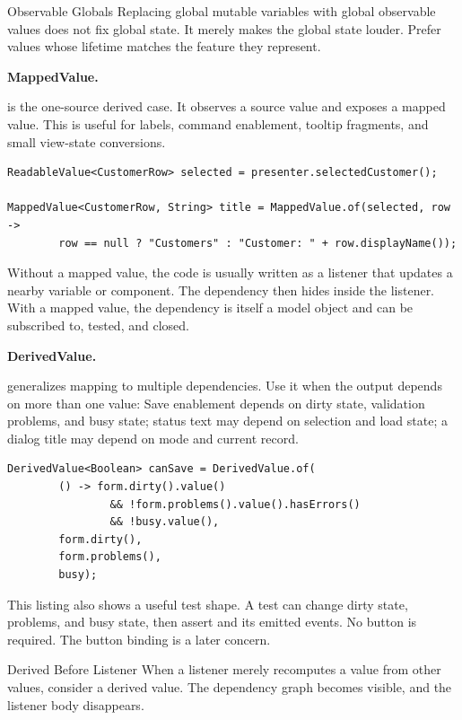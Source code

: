 \begin{pitfallbox}{Observable Globals}
Replacing global mutable variables with global observable values does not fix
global state. It merely makes the global state louder. Prefer values whose
lifetime matches the feature they represent.
\end{pitfallbox}

\textbf{MappedValue.}

 is the one-source derived case. It observes a source
value and exposes a mapped value. This is useful for labels, command enablement,
tooltip fragments, and small view-state conversions.

\begin{lstlisting}[caption={A display value derived from a selected row.}]
ReadableValue<CustomerRow> selected = presenter.selectedCustomer();

MappedValue<CustomerRow, String> title = MappedValue.of(selected, row ->
        row == null ? "Customers" : "Customer: " + row.displayName());
\end{lstlisting}

Without a mapped value, the code is usually written as a listener that updates a
nearby variable or component. The dependency then hides inside the listener. With
a mapped value, the dependency is itself a model object and can be subscribed to,
tested, and closed.

\textbf{DerivedValue.}

 generalizes mapping to multiple dependencies. Use it when
the output depends on more than one value: Save enablement depends on dirty
state, validation problems, and busy state; status text may depend on selection
and load state; a dialog title may depend on mode and current record.

\begin{lstlisting}[caption={Derived command enablement.}]
DerivedValue<Boolean> canSave = DerivedValue.of(
        () -> form.dirty().value()
                && !form.problems().value().hasErrors()
                && !busy.value(),
        form.dirty(),
        form.problems(),
        busy);
\end{lstlisting}

This listing also shows a useful test shape. A test can change dirty state,
problems, and busy state, then assert  and its emitted
events. No button is required. The button binding is a later concern.

\begin{principlebox}{Derived Before Listener}
When a listener merely recomputes a value from other values, consider a derived
value. The dependency graph becomes visible, and the listener body disappears.
\end{principlebox}

